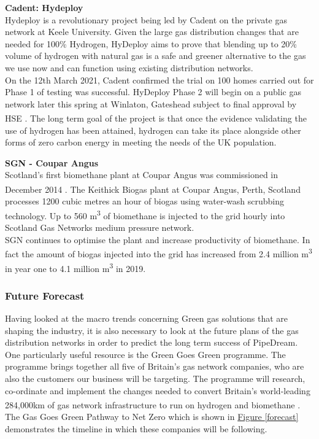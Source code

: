 \documentclass[11pt]{article}		%
\newcommand{\supercite}[1]{\textsuperscript{\cite{#1}}}		%
\newcommand{\figref}[1]{\hyperref[#1]{Figure \ref*{#1}}}    %
\begin{document}
    		\textbf{Cadent: Hydeploy}\\
            Hydeploy is a revolutionary project being led by Cadent on the private gas network at Keele University. Given the large gas distribution changes that are needed for 100\% Hydrogen, HyDeploy aims to prove that blending up to 20\% volume of hydrogen with natural gas is a safe and greener alternative to the gas we use now and can function using existing distribution networks.\\
            \hspace*{3ex}On the 12th March 2021, Cadent confirmed the trial on 100 homes carried out for Phase 1 of testing was successful. HyDeploy Phase 2 will begin on a public gas network later this spring at Winlaton, Gateshead subject to final approval by HSE \supercite{hydeploy}. The long term goal of the project is that once the evidence validating the use of hydrogen has been attained, hydrogen can take its place alongside other forms of zero carbon energy in meeting the needs of the UK population.
    
    		\textbf{SGN - Coupar Angus}\\
    
            Scotland’s first biomethane plant at Coupar Angus was commissioned in December 2014 \supercite{coupar}. The Keithick Biogas plant at Coupar Angus, Perth, Scotland processes 1200 cubic metres an hour of biogas using water-wash scrubbing technology. Up to 560 m\textsuperscript{3}  of biomethane is injected to the grid hourly into Scotland Gas Networks medium pressure network.\\
    	    \hspace*{3ex}SGN continues to optimise the plant and increase productivity of biomethane. In fact the amount of biogas injected into the grid has increased from 2.4 million m\textsuperscript{3} in year one to 4.1 million m\textsuperscript{3} in 2019\supercite{CAperforamnce}.
    
    		\subsubsection[Future Forecast]{Future Forecast}
    		
    		Having looked at the macro trends concerning Green gas solutions that are shaping the industry, it is also necessary to look at the future plans of the gas distribution networks in order to predict the long term success of PipeDream. \\
        	\hspace*{3ex}One particularly useful resource is the Green Goes Green programme. The programme brings together all five of Britain’s gas network companies, who are also the customers our business will be targeting. The programme will research, co-ordinate and implement the changes needed to convert Britain’s world-leading 284,000km of gas network infrastructure to run on hydrogen and biomethane \supercite{gasgoesgreen}. The Gas Goes Green Pathway to Net Zero which is shown in \figref{forecast} demonstrates the timeline in which these companies will be following.
    
\end{document}
